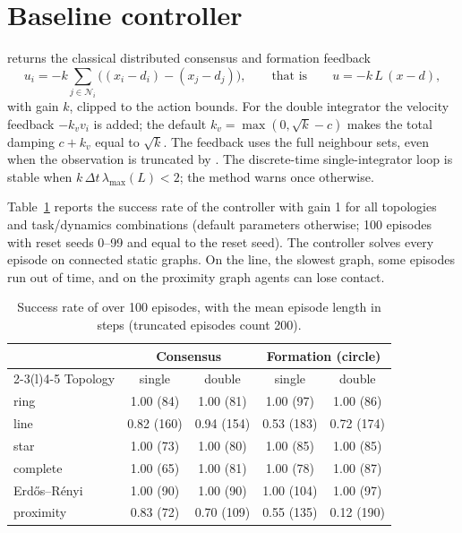 \section{Baseline controller}\label{sec:consensus-baseline}

 returns the
classical distributed consensus and formation feedback
\begin{equation}
  u_i = -k \sum_{j \in \mathcal{N}_i} \bigl((x_i - d_i) - (x_j - d_j)\bigr),
  \qquad\text{that is}\qquad u = -k\, L\,(x - d),
  \label{eq:laplacian-policy}
\end{equation}
with gain $k$, clipped to the action bounds. For the double integrator the
velocity feedback $-k_v v_i$ is added; the default
$k_v = \max(0, \sqrt{k} - c)$ makes the total damping $c + k_v$ equal to
$\sqrt{k}$. The feedback uses the full neighbour sets, even when the
observation is truncated by . The discrete-time
single-integrator loop is stable when $k\, \Delta t\, \lambda_{\max}(L) < 2$;
the method warns once otherwise.

Table~\ref{tab:consensus-baseline} reports the success rate of the controller
with gain 1 for all topologies and task/dynamics combinations (default
parameters otherwise; 100 episodes with reset seeds 0--99 and
 equal to the reset seed). The controller solves every
episode on connected static graphs. On the line, the slowest graph, some
episodes run out of time, and on the proximity graph agents can lose contact.

\begin{table}[htbp]
  \centering\small
  \caption{Success rate of  over 100 episodes,
    with the mean episode length in steps (truncated episodes count 200).}
  \label{tab:consensus-baseline}
  \begin{tabular}{@{}lcccc@{}}
    \toprule
    & \multicolumn{2}{c}{Consensus} & \multicolumn{2}{c}{Formation (circle)} \\
    \cmidrule(lr){2-3}\cmidrule(l){4-5}
    Topology & single & double & single & double \\
    \midrule
    ring        & 1.00 (84)  & 1.00 (81)  & 1.00 (97)  & 1.00 (86)  \\
    line        & 0.82 (160) & 0.94 (154) & 0.53 (183) & 0.72 (174) \\
    star        & 1.00 (73)  & 1.00 (80)  & 1.00 (85)  & 1.00 (85)  \\
    complete    & 1.00 (65)  & 1.00 (81)  & 1.00 (78)  & 1.00 (87)  \\
    Erd\H{o}s--R\'enyi & 1.00 (90) & 1.00 (90) & 1.00 (104) & 1.00 (97) \\
    proximity   & 0.83 (72)  & 0.70 (109) & 0.55 (135) & 0.12 (190) \\
    \bottomrule
  \end{tabular}
\end{table}

